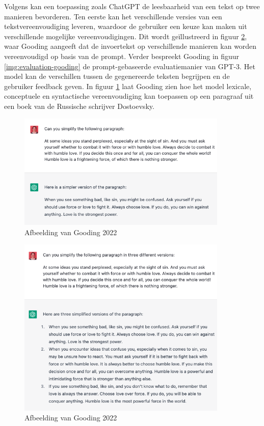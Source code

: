 \medspace

Volgens \textcite{Gooding2022} kan een toepassing zoals ChatGPT de leesbaarheid van een tekst op twee manieren bevorderen. Ten eerste kan het verschillende versies van een tekstvereenvoudiging leveren, waardoor de gebruiker een keuze kan maken uit verschillende mogelijke vereenvoudigingen. Dit wordt geïllustreerd in figuur \ref{img:different-versions-gooding}, waar Gooding aangeeft dat de invoertekst op verschillende manieren kan worden vereenvoudigd op basis van de prompt. Verder bespreekt Gooding in figuur \ref{img:evaluation-gooding} de prompt-gebaseerde evaluatiemanier van GPT-3. Het model kan de verschillen tussen de gegenereerde teksten begrijpen en de gebruiker feedback geven. In figuur \ref{img:simplification-gooding} laat Gooding zien hoe het model lexicale, conceptuele en syntactische vereenvoudiging kan toepassen op een paragraaf uit een boek van de Russische schrijver Dostoevsky.

\begin{figure}[H]
	\includegraphics[width=10cm]{img/chatgpt-example-simplification-gooding.png}
	\caption{Afbeelding van Gooding 2022}
	\label{img:simplification-gooding}
\end{figure}

\begin{figure}[H]
	\includegraphics[width=10cm]{img/chatgpt-example-different-versions-gooding.png}
	\caption{Afbeelding van Gooding 2022}
	\label{img:different-versions-gooding}
\end{figure}


